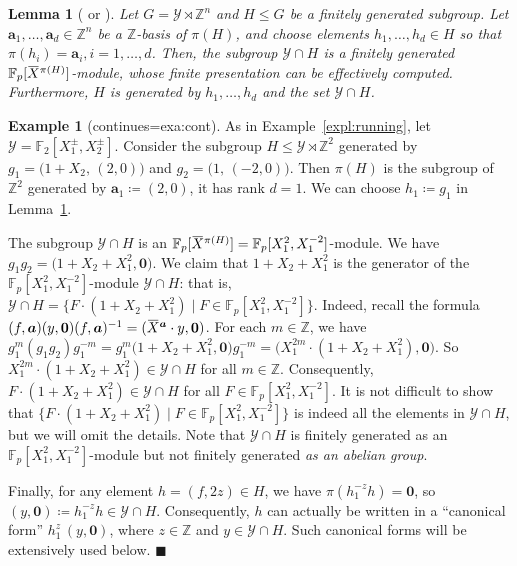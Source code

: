 \documentclass[a4paper,UKenglish,cleveref, autoref, thm-restate]{lipics-v2021}
\newcommand{\Z}{\mathbb{Z}}
\newcommand{\F}{\mathbb{F}}
\newcommand{\mY}{\mathcal{Y}}
\newcommand{\ba}{\boldsymbol{a}}
\newcommand{\bzer}{\boldsymbol{0}}
\newcommand{\oX}{\mkern 1.5mu\overline{\mkern-1.5mu X \mkern-1.5mu}\mkern 1.5mu}
\newtheorem{lem}[thrm]{Lemma}
\theoremstyle{definition}
\theoremstyle{definition}
\newtheorem{exmpl}[thrm]{Example}
\theoremstyle{definition}
\begin{document}
\begin{lem}[{\cite[Theorem~3.3]{baumslag1994algorithmic} or \cite[Lemma~2]{romanovskii1974some}}]\label{lem:structmeta}
    Let $G = \mY \rtimes \Z^n$ and $H \leq G$ be a finitely generated subgroup. Let $\ba_1, \ldots, \ba_{d} \in \Z^n$ be a $\Z$-basis of $\pi(H)$, and choose elements $h_1, \ldots, h_d \in H$ so that $\pi(h_i) = \ba_i, i = 1, \ldots, d$.
    Then, the subgroup $\mY \cap H$ is a finitely generated $\F_p[\oX^{\pi(H)}]$-module, whose finite presentation can be effectively computed. Furthermore, $H$ is generated by $h_1, \ldots, h_d$ and the set $\mY \cap H$.
\end{lem}

\renewcommand\thmcontinues[1]{continued}
\begin{exmpl}[continues=exa:cont]
As in Example~\ref{expl:running}, let $\mY = \F_2[X_1^{\pm}, X_2^{\pm}]$.
Consider the subgroup $H \leq \mY \rtimes \Z^2$ generated by $g_1 = \big(1 + X_2, \, (2, 0)\big)$ and $g_2 = \big(1, \, (- 2, 0)\big)$.
Then $\pi(H)$ is the subgroup of $\Z^2$ generated by $\ba_1 \coloneqq (2, 0)$, it has rank $d = 1$. 
We can choose $h_1 \coloneqq g_1$ in Lemma~\ref{lem:structmeta}.

The subgroup $\mY \cap H$ is an $\F_p[\oX^{\pi(H)}] = \F_p[X_1^2, X_1^{-2}]$-module. We have $g_1 g_2 = \big(1 + X_2 + X_1^2, \bzer \big)$.
We claim that $1 + X_2 + X_1^2$ is the generator of the $\F_p[X_1^2, X_1^{-2}]$-module $\mY \cap H$:
that is, $\mY \cap H = \{F \cdot (1 + X_2 + X_1^2) \mid F \in \F_p[X_1^2, X_1^{-2}]\}$. 
Indeed, recall the formula $(f, \ba)(y, \bzer)(f, \ba)^{-1} = (\oX^{\ba} \cdot y, \bzer)$.
For each $m \in \Z$, we have $g_1^m (g_1 g_2) g_1^{-m} = g_1^m \big(1 + X_2 + X_1^2, \bzer\big) g_1^{-m} = \big(X_1^{2m} \cdot (1 + X_2 + X_1^2), \bzer\big)$.
So $X_1^{2m} \cdot (1 + X_2 + X_1^2) \in \mY \cap H$ for all $m \in \Z$.
Consequently, $F \cdot (1 + X_2 + X_1^2) \in \mY \cap H$ for all $F \in \F_p[X_1^2, X_1^{-2}]$.
It is not difficult to show that $\{F \cdot (1 + X_2 + X_1^2) \mid F \in \F_p[X_1^2, X_1^{-2}]\}$ is indeed all the elements in $\mY \cap H$, but we will omit the details.
Note that $\mY \cap H$ is finitely generated as an $\F_p[X_1^2, X_1^{-2}]$-module but not finitely generated \emph{as an abelian group}.

Finally, for any element $h = (f, 2z) \in H$, we have $\pi(h_1^{-z} h) = \bzer$, so $(y, \bzer) \coloneqq h_1^{-z} h \in \mY \cap H$. 
Consequently, $h$ can actually be written in a ``canonical form'' $h_1^z \, (y, \bzer)$, where $z \in \Z$ and $y \in \mY \cap H$.
Such canonical forms will be extensively used below.
\hfill $\blacksquare$
\end{exmpl}
\end{document}
